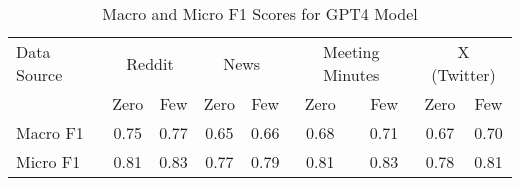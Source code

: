 \begin{table}[htbp]
\centering
\begin{tabular}{l *{8}{c}}
\toprule
Data Source & \multicolumn{2}{c}{Reddit} & \multicolumn{2}{c}{News} & \multicolumn{2}{c}{Meeting Minutes} & \multicolumn{2}{c}{X (Twitter)} \\
& Zero & Few & Zero & Few & Zero & Few & Zero & Few \\
\midrule
Macro F1 & 0.75 & 0.77 & 0.65 & 0.66 & 0.68 & 0.71 & 0.67 & 0.70 \\
Micro F1 & 0.81 & 0.83 & 0.77 & 0.79 & 0.81 & 0.83 & 0.78 & 0.81 \\
\bottomrule
\end{tabular}
\caption{Macro and Micro F1 Scores for GPT4 Model}
\label{tab:gpt4_macro_micro}
\end{table}